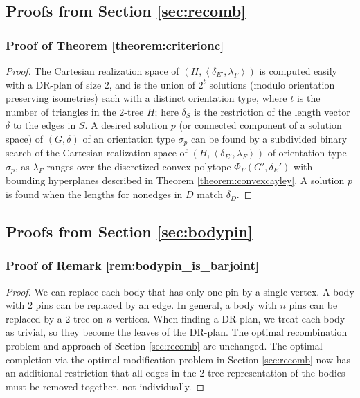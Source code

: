 \subsection{Proofs from Section \ref{sec:recomb}}



\subsubsection{Proof of Theorem \ref{theorem:criterionc}}
\begin{proof}
    The Cartesian realization space of $(H,\left<\delta_{E'}, \lambda_F\right>)$ is computed easily with a DR-plan of size 2, and is the union of $2^t$ solutions (modulo orientation preserving isometries) each with a distinct orientation type, where $t$ is the number of triangles in the 2-tree $H$; here $\delta_{S}$ is the restriction of the length vector $\delta$ to the edges in $S$. A desired solution $p$ (or connected component of a solution space) of $(G,\delta)$ of an orientation type $\sigma_p$ can be found by a subdivided binary search of the Cartesian realization space of $(H, \left<\delta_{E'}, \lambda_F\right>)$ of orientation type $\sigma_p$, as $\lambda_F$ ranges over the discretized convex polytope $\Phi_F(G',\delta_E')$ with bounding hyperplanes described in Theorem \ref{theorem:convexcayley}. A solution $p$ is found  when the lengths for nonedges in $D$ match $\delta_D$.
\end{proof}


\subsection{Proofs from Section \ref{sec:bodypin}}

\subsubsection{Proof of Remark \ref{rem:bodypin_is_barjoint}}
\begin{proof}
    We can replace each body that has only one pin by a single vertex. A body with 2 pins can be replaced by an edge. In general, a body with $n$ pins can be replaced by a 2-tree on $n$ vertices. When finding a DR-plan, we treat each body as trivial, so they become the leaves of the DR-plan. The optimal recombination problem and approach of Section \ref{sec:recomb} are unchanged. The optimal completion via the optimal modification problem in Section \ref{sec:recomb} now has an additional restriction that all edges in the 2-tree representation of the bodies must be removed together, not individually.
\end{proof}


